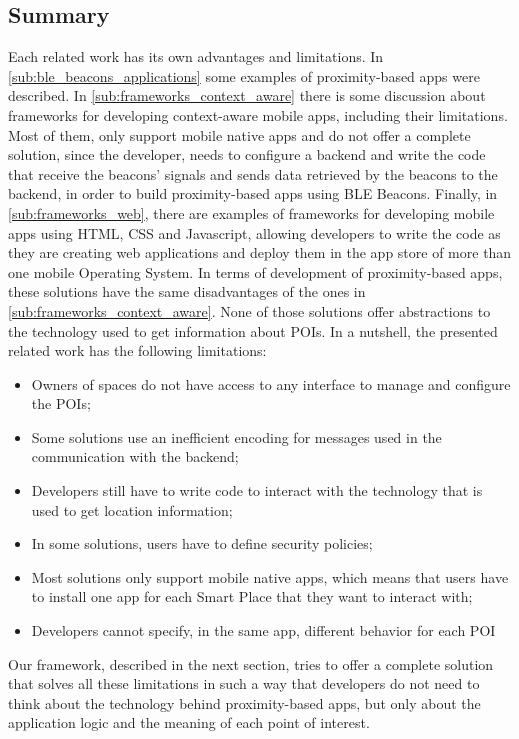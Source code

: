 \subsection{Summary}
\label{sub:summary}
Each related work has its own
advantages and limitations.
In \ref{sub:ble_beacons_applications} some
examples of proximity-based apps were described.
In \ref{sub:frameworks_context_aware} there is
some discussion about
frameworks for developing context-aware mobile apps,
including their limitations.
Most of them, only support mobile native apps and
do not offer a complete solution, since the developer,
needs to configure a backend and write the code that
receive the beacons' signals and sends data retrieved by 
the beacons to the backend, in order to build 
proximity-based apps using BLE Beacons.
Finally, in \ref{sub:frameworks_web}, there are
examples of frameworks for developing mobile apps
using HTML, CSS and Javascript, allowing developers
to write the code as they are creating web applications
and deploy them in the app store of more than one
mobile Operating System.
In terms of development of proximity-based apps,
these solutions have the same disadvantages of the
ones in \ref{sub:frameworks_context_aware}.
None of those solutions offer abstractions to
the technology used to get information about POIs.
In a nutshell, the presented related work has
the following limitations:
\begin{itemize}
\item Owners of spaces do not have access to
any interface to manage and configure the POIs;
\item Some solutions use an inefficient encoding
for messages used in the communication with
the backend;
\item Developers still have to write code to
interact with the technology that is used to
get location information;
\item In some solutions, users have to define
security policies;
\item Most solutions only support mobile native
apps, which means that users have to install
one app for each Smart Place that they want
to interact with;
\item Developers cannot specify, in the same app,
different behavior for each POI
\end{itemize}
Our framework, described in the next section, tries 
to offer a complete solution that solves all
these limitations in such a way that developers do not
need to think about the technology behind proximity-based
apps, but only about the application logic and the meaning
of each point of interest.